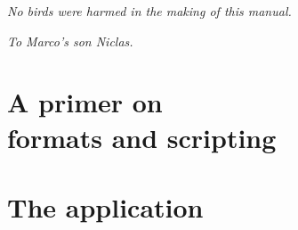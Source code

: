 \documentclass[a4paper,twoside,12pt]{memoir}
\begin{document}
\vspace*{25em}

\begin{flushright}
\em No birds were harmed in the making of this manual.
\end{flushright}






\cleardoublepage

\vspace*{25em}

\begin{flushright}
\em To Marco's son Niclas.
\end{flushright}

\cleardoublepage

\tableofcontents*

\cleardoublepage

\listoffigures*

\cleardoublepage

\listoftables*

\mainmatter

\part[A primer on formats and scripting]{A primer on\\ formats and scripting}
\label{part:primer}




\part{The application}
\label{part:application}


\end{document}
